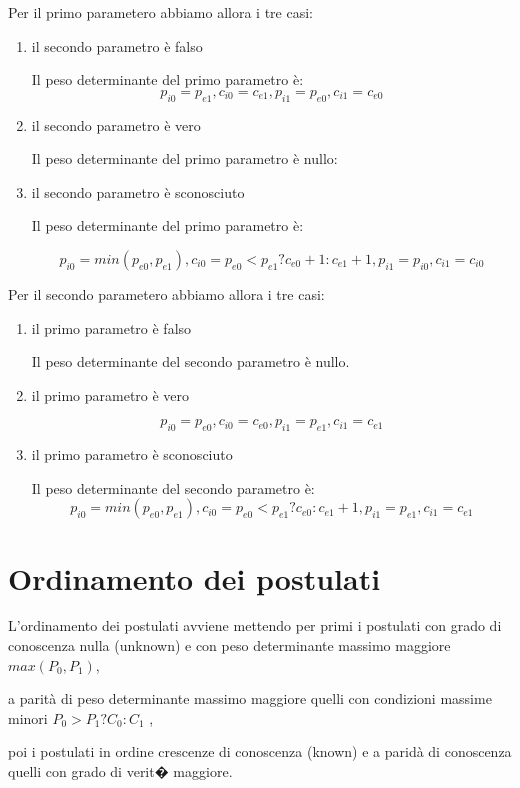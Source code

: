 \documentclass{article}
\begin{document}
  Per il primo parametero abbiamo allora i tre casi:
  \begin{enumerate}
    \item il secondo parametro \`e falso
 
      Il peso determinante del primo parametro \`e:
      \begin{equation}
	p_{i0}=p_{e1}, c_{i0}=c_{e1}, p_{i1}=p_{e0},c_{i1}=c_{e0}
      \end{equation}

    \item il secondo parametro \`e vero
      
      Il peso determinante del primo parametro \`e nullo:
      
    \item il secondo parametro \`e sconosciuto
 
      Il peso determinante del primo parametro \`e:
      
      \begin{equation}
	p_{i0}=min(p_{e0},p_{e1}), c_{i0}=p_{e0}< p_{e1} ? c_{e0}+1 : c_{e1} + 1,
	  p_{i1}=p_{i0}, c_{i1}=c_{i0}
      \end{equation}

  \end{enumerate}
  
  Per il secondo parametero abbiamo allora i tre casi:
  \begin{enumerate}
    \item il primo parametro \`e falso
 
      Il peso determinante del secondo parametro \`e nullo.

    \item il primo parametro \`e vero
      
      \begin{equation}
	p_{i0}=p_{e0}, c_{i0}=c_{e0}, p_{i1}=p_{e1}, c_{i1}=c_{e1}
      \end{equation}

    \item il primo parametro \`e sconosciuto
 
      Il peso determinante del secondo parametro \`e:      
      \begin{equation}
	p_{i0}=min(p_{e0},p_{e1}), c_{i0}=p_{e0}< p_{e1} ? c_{e0} : c_{e1} + 1,
	p_{i1}=p_{e1}, c_{i1}=c_{e1}
      \end{equation}

  \end{enumerate}

  \section{Ordinamento dei postulati}
  
  L'ordinamento dei postulati avviene mettendo per primi i postulati con grado
  di conoscenza nulla (unknown) e con peso determinante massimo maggiore
  $max(P_0,P_1)$,
  
  a parit\`a di peso determinante massimo maggiore quelli con condizioni
  massime minori $P_0 > P_1 ? C_0 : C_1$ ,
  
  poi i postulati in ordine crescenze di conoscenza (known) e a parid\`a di
  conoscenza quelli con grado di verit� maggiore.
  
\end{document}
